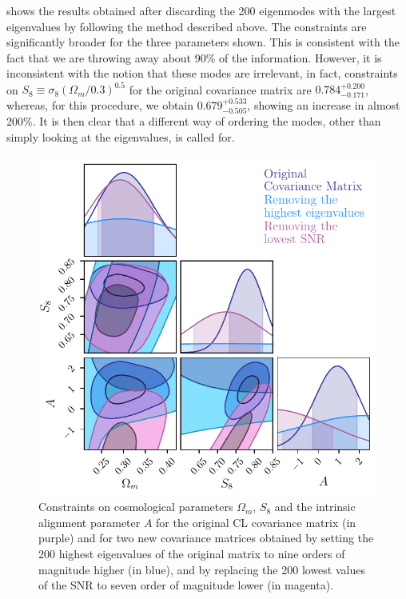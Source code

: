 \documentclass[twocolumn]{\docclass}
\begin{document}
	 shows the results obtained after discarding the 200 eigenmodes with the largest eigenvalues by following the method described above.  The constraints are significantly broader for the three parameters shown. This is consistent with the fact that we are throwing away about 90\% of the information. However, it is inconsistent with the notion that these modes are irrelevant, in fact, constraints on $S_8\equiv \sigma_8 (\Omega_m/0.3)^{0.5}$ for the original covariance matrix are $0.784^{+ 0.200}_{- 0.171}$, whereas, for this procedure, we obtain $0.679^{+ 0.533}_{- 0.505}$, showing an increase in almost 200\%. It is then clear that a different way of ordering the modes, other than simply looking at the eigenvalues, is called for.	
	
	\begin{figure}
		\includegraphics[width=0.9\columnwidth]{Parameters.pdf}
		\caption{Constraints on cosmological parameters $\Omega_m$, $S_8$ and the intrinsic alignment parameter $A$ for the original CL covariance matrix (in purple) and for two new covariance matrices obtained by setting the 200 highest eigenvalues of the original matrix to nine orders of magnitude higher (in blue), and by replacing the 200 lowest values of the SNR to seven order of magnitude lower (in magenta). \label{fig:eig_snr}}
	\end{figure}
	
	
\end{document}
